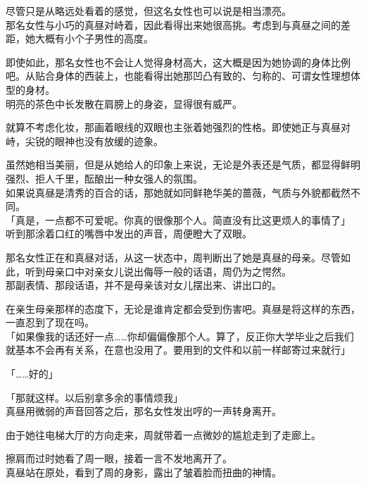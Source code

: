 尽管只是从略远处看着的感觉，但这名女性也可以说是相当漂亮。\\

那名女性与小巧的真昼对峙着，因此看得出来她很高挑。考虑到与真昼之间的差距，她大概有小个子男性的高度。

即使如此，那名女性也不会让人觉得身材高大，这大概是因为她协调的身体比例吧。从贴合身体的西装上，也能看得出她那凹凸有致的、匀称的、可谓女性理想体型的身材。\\

明亮的茶色中长发散在肩膀上的身姿，显得很有威严。

就算不考虑化妆，那画着眼线的双眼也主张着她强烈的性格。即使她正与真昼对峙，尖锐的眼神也没有放缓的迹象。

虽然她相当美丽，但是从她给人的印象上来说，无论是外表还是气质，都显得鲜明强烈、拒人千里，酝酿出一种女强人的氛围。\\

如果说真昼是清秀的百合的话，那她就如同鲜艳华美的蔷薇，气质与外貌都截然不同。\\

「真是，一点都不可爱呢。你真的很像那个人。简直没有比这更烦人的事情了」\\

听到那涂着口红的嘴唇中发出的声音，周便瞪大了双眼。

那名女性正在和真昼对话，从这一状态中，周判断出了她是真昼的母亲。尽管如此，听到母亲口中对亲女儿说出侮辱一般的话语，周仍为之愕然。\\

那副表情、那段话语，并不是母亲该对女儿摆出来、讲出口的。

在亲生母亲那样的态度下，无论是谁肯定都会受到伤害吧。真昼是将这样的东西，一直忍到了现在吗。\\

「如果像我的话还好一点……你却偏偏像那个人。算了，反正你大学毕业之后我们就基本不会再有关系，在意也没用了。要用到的文件和以前一样邮寄过来就行」

「……好的」

「那就这样。以后别拿多余的事情烦我」\\

真昼用微弱的声音回答之后，那名女性发出哼的一声转身离开。

由于她往电梯大厅的方向走来，周就带着一点微妙的尴尬走到了走廊上。

擦肩而过时她看了周一眼，接着一言不发地离开了。\\

真昼站在原处，看到了周的身影，露出了皱着脸而扭曲的神情。\\

